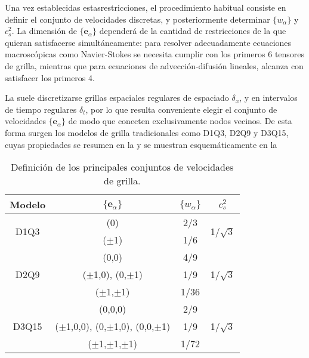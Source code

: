 Una vez establecidas estasrestricciones, el procedimiento habitual consiste en definir el conjunto de velocidades discretas, y posteriormente determinar $\{w_{\alpha}\}$ y $c_s^2$. La dimensi\'on de $\{ \bm{e}_{\alpha}\}$ depender\'a de la cantidad de restricciones de la  que quieran satisfacerse simult\'aneamente: para resolver adecuadamente ecuaciones macrosc\'opicas como Navier-Stokes se necesita cumplir con los primeros 6 tensores de grilla, mientras que para ecuaciones de advecci\'on-difusi\'on lineales, alcanza con satisfacer los primeros 4.
\par
La  suele discretizarse grillas espaciales regulares de espaciado $\delta_x$, y en intervalos de tiempo regulares $\delta_t$, por lo que resulta conveniente elegir el conjunto de velocidades $\{ \bm{e}_{\alpha} \}$ de modo que conecten exclusivamente nodos vecinos. De esta forma surgen los modelos de grilla tradicionales como D1Q3, D2Q9 y D3Q15, cuyas propiedades se resumen en la  y se muestran esquem\'aticamente en la 

\begin{table}[ht]
	\centering
    \begin{tabular}{c c c c}
	    \toprule
        \bf Modelo & $\{\bm{e}_{\alpha}\}$ & $\{w_{\alpha}\}$ & $c_s^2$ \\
        \midrule
        \multirow{2}{*}{D1Q3} & (0)      & 2/3 & \multirow{2}{*}{1/$\sqrt{3}$} \\
                              & ($\pm$1) & 1/6 &  \\                 
        \midrule
        \multirow{3}{*}{D2Q9} & (0,0) & 4/9 & \multirow{3}{*}{1/$\sqrt{3}$} \\
                              & ($\pm$1,0), (0,$\pm$1) & 1/9 &  \\
                              & ($\pm$1,$\pm$1) & 1/36 &  \\                              
        \midrule
        \multirow{3}{*}{D3Q15} & (0,0,0) & 2/9 & \multirow{3}{*}{1/$\sqrt{3}$} \\
                               & ($\pm$1,0,0), (0,$\pm$1,0), (0,0,$\pm$1) & 1/9 &  \\
                               & ($\pm$1,$\pm$1,$\pm$1) & 1/72 &  \\         
        \bottomrule
	\end{tabular}
	\caption{Definici\'on de los principales conjuntos de velocidades de grilla.}
	\label{tab:DdQq}
\end{table}  


